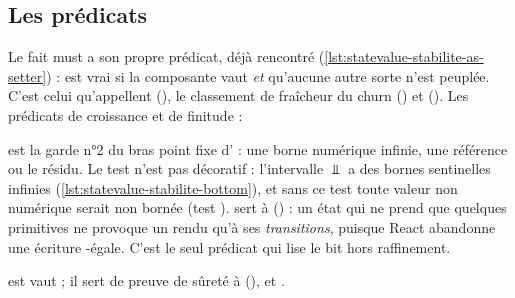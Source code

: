 \subsection{Les prédicats}

Le fait must a son propre prédicat, déjà rencontré
(\cref{lst:statevalue-stabilite-as-setter}) :
 est vrai si la composante 
vaut  \emph{et} qu'aucune autre sorte n'est peuplée. C'est
celui qu'appellent 
(), le classement de
fraîcheur du churn () et
 (). Les
prédicats de croissance et de finitude :


 est la garde n°2 du bras point fixe
d' : une borne numérique infinie, une référence
 ou le résidu. Le test  n'est
pas décoratif : l'intervalle $\Bot$ a des bornes sentinelles infinies
(\cref{lst:statevalue-stabilite-bottom}), et sans ce test toute valeur non
numérique serait \og non bornée\fg{} (test
). 
sert à 
() : un état qui ne
prend que quelques primitives ne provoque un rendu qu'à ses
\emph{transitions}, puisque React abandonne une écriture
-égale. C'est le seul prédicat qui lise le bit
 hors raffinement.


 est \og {} vaut \fg{} ; il
sert de preuve de sûreté à 
(), 
et .

